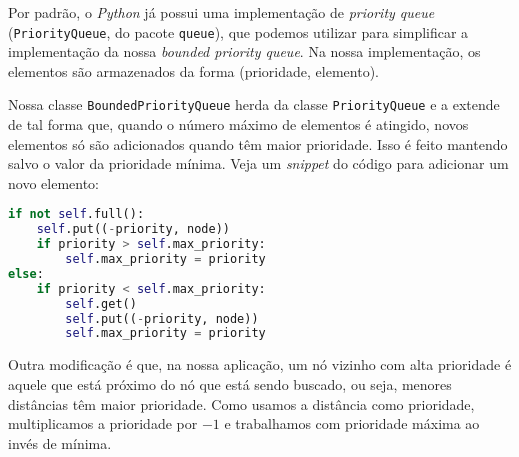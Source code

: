         Por padrão, o \textit{Python} já possui uma implementação de \textit{priority queue} (\lstinline{PriorityQueue}, do pacote \lstinline{queue}), que podemos utilizar para simplificar a implementação da nossa \textit{bounded priority queue}. Na nossa implementação, os elementos são armazenados da forma (prioridade, elemento).
        
        Nossa classe \lstinline{BoundedPriorityQueue} herda da classe \lstinline{PriorityQueue} e a extende de tal forma que, quando o número máximo de elementos é atingido, novos elementos só são adicionados quando têm maior prioridade. Isso é feito mantendo salvo o valor da prioridade mínima. Veja um \textit{snippet} do código para adicionar um novo elemento:
        \begin{lstlisting}[language=Python]
if not self.full():
    self.put((-priority, node))
    if priority > self.max_priority:
        self.max_priority = priority
else:
    if priority < self.max_priority:
        self.get()
        self.put((-priority, node))
        self.max_priority = priority
        \end{lstlisting}
        Outra modificação é que, na nossa aplicação, um nó vizinho com alta prioridade é aquele que está próximo do nó que está sendo buscado, ou seja, menores distâncias têm maior prioridade. Como usamos a distância como prioridade, multiplicamos a prioridade por $-1$ e trabalhamos com prioridade máxima ao invés de mínima.
